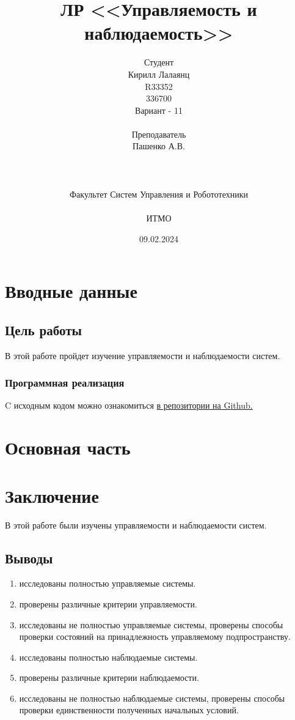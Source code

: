 \documentclass[16pt]{article}
\title{ЛР \textnumero 7 <<Управляемость и наблюдаемость>>}
\author{
Студент \\
Кирилл Лалаянц\\
R33352\\
336700\\
Вариант - 11\\
\\
Преподаватель\\
Пашенко А.В. \\
\\
\\
\\
Факультет Систем Управления и Робототехники\\
\\
ИТМО\\
}
\date{09.02.2024}
\begin{document}
\maketitle
\newpage
\tableofcontents
\thispagestyle{empty}

\newpage
\setcounter{page}{1}
\section{Вводные данные}
\subsection{Цель работы}
В этой работе пройдет изучение управляемости и наблюдаемости систем.


\subsubsection{Программная реализация}
C исходным кодом можно ознакомиться \href{https://github.com/lalayants/control-theory-itmo-2023-2024}{в репозитории на Github.}
\newpage
\section{Основная часть}


\newpage


\newpage



\newpage


\newpage
\section{Заключение}
В этой работе были изучены управляемости и наблюдаемости систем.
\subsection{Выводы}
\begin{enumerate}
   \item исследованы полностью управляемые системы. 
   \item проверены различные критерии управляемости. 
   \item исследованы не полностью управляемые системы, проверены способы проверки состояний на принадлежность управляемому подпространству. 
   \item исследованы полностью наблюдаемые системы. 
   \item проверены различные критерии наблюдаемости. 
   \item исследованы не полностью наблюдаемые системы, проверены способы проверки единственности полученных начальных условий. 
\end{enumerate}
\end{document}
